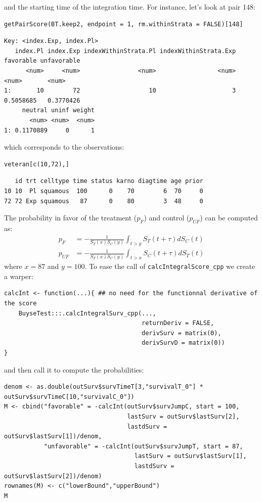 \documentclass[12pt]{article}
\begin{document}
and the starting time of the integration time. For instance, let's
look at pair 148:
\lstset{language=r,label= ,caption= ,captionpos=b,numbers=none}
\begin{lstlisting}
getPairScore(BT.keep2, endpoint = 1, rm.withinStrata = FALSE)[148]
\end{lstlisting}

\begin{verbatim}
Key: <index.Exp, index.Pl>
   index.Pl index.Exp indexWithinStrata.Pl indexWithinStrata.Exp favorable unfavorable
      <num>     <num>                <num>                 <num>     <num>       <num>
1:       10        72                   10                     3 0.5058685   0.3770426
     neutral uninf weight
       <num> <num>  <num>
1: 0.1170889     0      1
\end{verbatim}


which corresponds to the observations:
\lstset{language=r,label= ,caption= ,captionpos=b,numbers=none}
\begin{lstlisting}
veteran[c(10,72),]
\end{lstlisting}

\begin{verbatim}
   id trt celltype time status karno diagtime age prior
10 10  Pl squamous  100      0    70        6  70     0
72 72 Exp squamous   87      0    80        3  48     0
\end{verbatim}


The probability in favor of the treatment (\(p_F\)) and control (\(p_{UF}\)) can be computed
as:
\begin{align*}
p_F &= -\frac{1}{S_T(x)S_C(y)}\int_{t>y} S_T(t+\tau) dS_C(t) \\
p_{UF} &= -\frac{1}{S_T(x)S_C(y)}\int_{t>x} S_C(t+\tau) dS_T(t)
\end{align*}
where \(x=87\) and \(y=100\). To ease the call of \texttt{calcIntegralScore\_cpp} we create a warper:
\lstset{language=r,label= ,caption= ,captionpos=b,numbers=none}
\begin{lstlisting}
calcInt <- function(...){ ## no need for the functionnal derivative of the score 
    BuyseTest:::.calcIntegralSurv_cpp(..., 
                                      returnDeriv = FALSE, 
                                      derivSurv = matrix(0), 
                                      derivSurvD = matrix(0))
}
\end{lstlisting}

\clearpage

and then call it to compute the probabilities:
\lstset{language=r,label= ,caption= ,captionpos=b,numbers=none}
\begin{lstlisting}
denom <- as.double(outSurv$survTimeT[3,"survivalT_0"] * outSurv$survTimeC[10,"survivalC_0"])
M <- cbind("favorable" = -calcInt(outSurv$survJumpC, start = 100, 
                                  lastSurv = outSurv$lastSurv[2],
                                  lastdSurv = outSurv$lastSurv[1])/denom,
           "unfavorable" = -calcInt(outSurv$survJumpT, start = 87, 
                                    lastSurv = outSurv$lastSurv[1],
                                    lastdSurv = outSurv$lastSurv[2])/denom)
rownames(M) <- c("lowerBound","upperBound")
M
\end{lstlisting}
\end{document}
